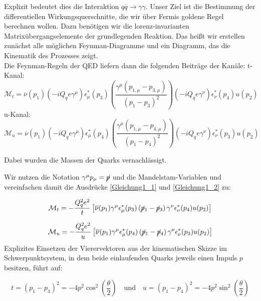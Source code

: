  Explizit bedeutet dies die Interaktion $q\overline{q} \rightarrow \gamma \gamma$. Unser Ziel ist die Bestimmung der differentiellen Wirkungsquerschnitte, die wir über Fermis goldene Regel berechnen wollen. Dazu benötigen wir die lorenz-invarianten Matrixübergangselemente der grundlegenden Reaktion. Das heißt wir erstellen zunächst alle möglichen Feynman-Diagramme und ein Diagramm, das die Kinematik des Prozesses zeigt.\\
Die Feynman-Regeln der QED liefern dann die folgenden Beiträge der Kanäle:
t-Kanal:
\begin{equation}
 \mathcal{M}_t = \overline{\nu}\left(p_1\right) \left(-iQ_qe\gamma^\mu\right) \epsilon^*_\mu\left(p_3\right) \left(\frac{\gamma^\mu \left(p_{1,\mu} - p_{3, \mu}\right)}{\left(p_1 - p_3\right)^2}\right) \left(-iQ_qe\gamma^\nu\right) \epsilon^*_\nu\left(p_4\right) u\left( p_2\right)
 \label{Gleichung1_1}
\end{equation}
u-Kanal:
\begin{equation}
	 \mathcal{M}_u = \overline{\nu}\left(p_1\right) \left(-iQ_qe\gamma^\mu\right) \epsilon^*_\mu\left(p_4\right) \left(\frac{\gamma^\mu \left(p_{1,\mu} - p_{4, \mu}\right)}{\left(p_1 - p_4\right)^2}\right) \left(-iQ_qe\gamma^\nu\right) \epsilon^*_\nu\left(p_3\right) u\left( p_2\right)
	 \label{Gleichung1_2}
\end{equation}

Dabei wurden die Massen der Quarks vernachlässigt.

Wir nutzen die Notation $\gamma^\mu p_\mu = \cancel{p}$ und die Mandelstam-Variablen  und vereinfachen damit die Ausdrücke \autoref{Gleichung1_1} und \autoref{Gleichung1_2} zu:

\begin{equation}
\mathcal{M}_t = -\frac{Q_q^2e^2}{t}\left[ \overline{\nu}(p_1) \gamma^\mu \epsilon^*_\mu(p_3) \left(\cancel{p}_1 - \cancel{p}_3\right) \gamma^\nu \epsilon^*_\nu(p_4) u(p_2)\right] 
\end{equation}

\begin{equation}
	\mathcal{M}_u = -\frac{Q_q^2e^2}{u}\left[ \overline{\nu}(p_1) \gamma^\mu \epsilon^*_\mu(p_4) \left(\cancel{p}_1 - \cancel{p}_4\right) \gamma^\nu \epsilon^*_\nu(p_3) u(p_2)\right]
\end{equation}
Explizites Einsetzen der Vierervektoren aus der kinematischen Skizze im Schwerpunktsystem, in dem beide einlaufenden Quarks jeweils einen Impuls $p$ besitzen, führt auf:

\begin{equation}
	t = \left(p_1 -p_3\right)^2 = -4 p^2 \cos^2\left(\frac{\theta}{2}\right) \quad \text{und} \quad u = (p_1-p_4)^2 = -4p^2 \sin^2\left(\frac{\theta}{2}\right)
\end{equation} 

